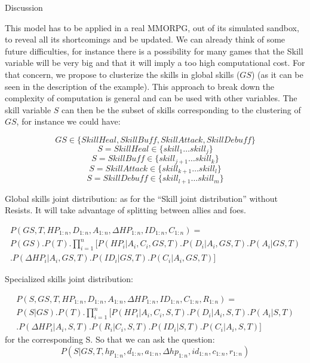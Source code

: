 \begin{center}
Discussion
\end{center}

This model has to be applied in a real MMORPG, out of its simulated sandbox, to reveal all its shortcomings and be updated. We can already think of some future difficulties, for instance there is a possibility for many games that the Skill variable will be very big and that it will imply a too high computational cost. For that concern, we propose to clusterize the skills in global skills ($GS$) (as it can be seen in the description of the example). This approach to break down the complexity of computation is general and can be used with other variables. The skill variable $S$ can then be the subset of skills corresponding to the clustering of $GS$, for instance we could have:

$$GS \in \{SkillHeal, SkillBuff, SkillAttack, SkillDebuff\}$$
$$S = SkillHeal \in \{skill_1 \dots skill_j\}$$
$$S = SkillBuff \in \{skill_{j+1} \dots skill_k\}$$
$$S = SkillAttack \in \{skill_{k+1} \dots skill_l\}$$
$$S = SkillDebuff \in \{skill_{l+1} \dots skill_m\}$$

Global skills joint distribution: as for the “Skill joint distribution” without Resists. It will take advantage of splitting between allies and foes.

\begin{eqnarray*}
P(GS,T,HP_{1:n},D_{1:n},A_{1:n},\Delta HP_{1:n}, ID_{1:n}, C_{1:n}) = \\
P(GS).P(T).\prod_{i=1}^n [ P(HP_i | A_i, C_i, GS, T).P(D_i | A_i, GS, T).P(A_i | GS, T)\\
                        .P(\Delta HP_i | A_i, GS, T).P(ID_i | GS, T).P(C_i | A_i, GS, T)]
\end{eqnarray*}

Specialized skills joint distribution:

\begin{eqnarray*}
P(S,GS,T,HP_{1:n},D_{1:n},A_{1:n},\Delta HP_{1:n}, ID_{1:n}, C_{1:n}, R_{1:n}) = \\
P(S|GS).P(T).\prod_{i=1}^n [ P(HP_i | A_i, C_i, S, T).P(D_i | A_i, S, T).P(A_i | S, T)\\
                        .P(\Delta HP_i | A_i, S, T).P(R_i | C_i, S, T).P(ID_i | S, T).P(C_i | A_i, S, T)]
\end{eqnarray*}
for the corresponding S. So that we can ask the question:
$$P(S | GS, T, hp_{1:n}, d_{1:n}, a_{1:n}, \Delta hp_{1:n}, id_{1:n}, c_{1:n}, r_{1:n})$$

